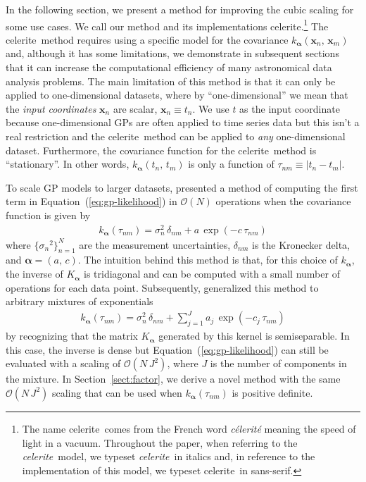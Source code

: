 \documentclass[manuscript, letterpaper]{aastex6}
\makeatletter
\let\origsection\section
\renewcommand\section{\@ifstar{\starsection}{\nostarsection}}
\newcommand\nostarsection[1]{\sectionprelude\origsection{#1}}
\newcommand\starsection[1]{\sectionprelude\origsection*{#1}}
\newcommand\sectionprelude{\vspace{1em}}
\newcommand{\project}[1]{\textsf{#1}}
\newcommand{\celerite}{\project{celerite}}
\newcommand{\celeriteterm}{\emph{celerite}}
\newcommand{\foreign}[1]{\emph{#1}}
\renewcommand{\eqref}[1]{\ref{eq:#1}}
\newcommand{\Eq}[1]{Equation~(\eqref{#1})}
\newcommand{\eq}[1]{\Eq{#1}}
\newcommand{\eqlabel}[1]{\label{eq:#1}}
\newcommand{\sectionname}{Section}
\newcommand{\sectref}[1]{\ref{sect:#1}}
\newcommand{\Sect}[1]{\sectionname~\sectref{#1}}
\newcommand{\sect}[1]{\Sect{#1}}
\newcommand{\sectlabel}[1]{\label{sect:#1}}
\newcommand{\bvec}[1]{{\ensuremath{\boldsymbol{#1}}}}
\newcommand{\response}[1]{{\color{blue}#1}}
\makeatother
\begin{document}
In the following section, we present a method for improving the cubic scaling
for some use cases.
We call our method and its implementations \celerite.\footnote{The name
\celerite\ comes from the French word \foreign{c\'elerit\'e} meaning the speed
of light in a vacuum.
\response{Throughout the paper, when referring to the \celeriteterm\ model, we
typeset \celeriteterm\ in italics and, in reference to the implementation of
this model, we typeset \celerite\ in sans-serif.}}
The \celerite\ method requires using a specific model
for the covariance $k_\bvec{\alpha}(\bvec{x}_n,\,\bvec{x}_m)$ and, although it
has some limitations, we demonstrate in subsequent sections that it can
increase the computational efficiency of many astronomical data analysis
problems.
The main limitation of this method is that it can only be applied to
one-dimensional datasets, where by ``one-dimensional'' we mean that the
 \emph{input coordinates} $\bvec{x}_n$ are scalar, $\bvec{x}_n \equiv
t_n$.
We use $t$ as the input coordinate because one-dimensional GPs are often
applied to time series data but this isn't a real restriction and the
\celerite\ method can be applied to \emph{any} one-dimensional dataset.
Furthermore, the covariance function for the \celerite\ method is
``stationary''.
In other words, $k_\bvec{\alpha}(t_n,\,t_m)$ is only a function of $\tau_{nm}
\equiv |t_n - t_m|$.


\section{The celerite model}\sectlabel{celerite}

To scale GP models to larger datasets, \citet{Rybicki:1995} presented a method
of computing the first term in \eq{gp-likelihood} in $\mathcal{O}(N)$
operations when the covariance function is given by
\begin{eqnarray}\eqlabel{kernel-simple}
k_\bvec{\alpha}(\tau_{nm}) = \sigma_n^2\,\delta_{nm} + a\,\exp(-c\,\tau_{nm})
\end{eqnarray}
where $\{{\sigma_n}^2\}_{n=1}^N$ are the measurement uncertainties,
$\delta_{nm}$ is the Kronecker delta, and $\bvec{\alpha} = (a,\,c)$.
The intuition behind this method is that, for this choice of $k_\bvec{\alpha}$,
the inverse of $K_\bvec{\alpha}$ is tridiagonal and can be computed
with a small number of operations for each data point.
Subsequently, \citet{Ambikasaran:2015} generalized this method to arbitrary
mixtures of exponentials
\begin{eqnarray}
k_\bvec{\alpha}(\tau_{nm}) = \sigma_n^2\,\delta_{nm} +
    \sum_{j=1}^J a_j\,\exp(-c_j\,\tau_{nm})
\end{eqnarray}
\response{by recognizing that the matrix $K_\bvec{\alpha}$ generated by this
kernel is semiseparable.}
In this case, the inverse is dense but \eq{gp-likelihood} can still be
evaluated with a scaling of $\mathcal{O}(N\,J^2)$, where $J$ is the number of
components in the mixture.
\response{In \sect{factor}, we derive a novel method with the same
$\mathcal{O}(N\,J^2)$ scaling that can be used when
$k_\bvec{\alpha}(\tau_{nm})$ is positive definite.}
\end{document}
